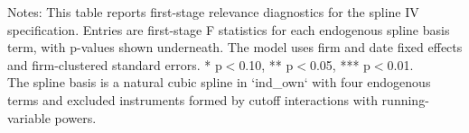 \begin{table}[!htbp]
\begin{threeparttable}
\begin{tabular}{lccc}
\bottomrule
\end{tabular}
\vspace{0.35em}
\noindent\parbox{\textwidth}{\footnotesize
Notes: This table reports first-stage relevance diagnostics for the spline IV specification. Entries are first-stage F statistics for each endogenous spline basis term, with p-values shown underneath. The model uses firm and date fixed effects and firm-clustered standard errors. * p$<$0.10, ** p$<$0.05, *** p$<$0.01.\\
The spline basis is a natural cubic spline in `ind_own` with four endogenous terms and excluded instruments formed by cutoff interactions with running-variable powers.
}
\end{threeparttable}
\end{table}
